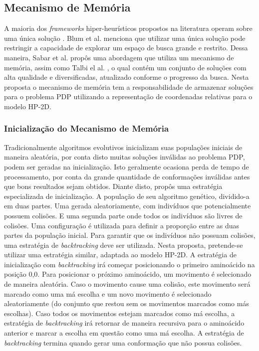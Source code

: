 \subsection{Mecanismo de Memória}
\label{sub:MecanismoDeMemoria}

A maioria dos \textit{frameworks} hiper-heurísticos propostos na literatura operam sobre uma única solução \cite{chakhlevitch2008hyperheuristics, burke2013hyper}. Blum et al. \cite{blum2011hybrid} menciona que utilizar uma única solução pode restringir a capacidade de explorar um espaço de busca grande e restrito. Dessa maneira, Sabar et al. \cite{sabar2014automatic} propôs uma abordagem que utiliza um mecanismo de memória, assim como Talbi el al. \cite{talbi2006cosearch}, o qual contém um conjunto de soluções com alta qualidade e diversificadas, atualizado conforme o progresso da busca. Nesta proposta o mecanismo de memória tem a responsabilidade de armazenar soluções para o problema PDP utilizando a representação de coordenadas relativas para o modelo HP-2D. 

\subsubsection{Inicialização do Mecanismo de Memória}

Tradicionalmente algoritmos evolutivos inicializam suas populações iniciais de maneira aleatória, por conta disto  muitas soluções inválidas ao problema PDP, podem ser geradas na inicialização. Isto geralmente  ocasiona perda de tempo de processamento, por conta da grande quantidade de conformações inválidas antes que bons resultados sejam obtidos. Diante disto, \cite{benitez2015algoritmo} propôs uma estratégia especializada de inicialização. A população de seu algoritmo genético, dividido-a em duas partes. Uma gerada aleatoriamente, com indivíduos que potencialmente possuem colisões. E uma segunda parte onde todos os indivíduos são livres de colisões. Uma configuração é utilizada para definir a proporção entre as duas partes da população inicial. Para garantir que os indivíduos não possuam colisões, uma estratégia de \textit{backtracking} deve ser utilizada. Nesta proposta, pretende-se utilizar uma estratégia similar, adaptada ao modelo HP-2D.  A estratégia de inicialização com \textit{backtracking} irá começar posicionando o primeiro aminoácido na posição 0,0. Para posicionar o próximo aminoácido, um movimento é selecionado de maneira aleatória. Caso o movimento cause uma colisão, este movimento será marcado como uma má escolha e um novo movimento é selecionado aleatoriamente (do conjunto que restou sem os movimentos marcados como más escolhas). Caso todos os movimentos estejam marcados como má escolha, a estratégia de \textit{backtracking} irá retornar de maneira recursiva para o aminoácido anterior e marcar a escolha em questão como uma má escolha. A estratégia de \textit{backtracking} termina quando gerar uma conformação que não possua colisões.

